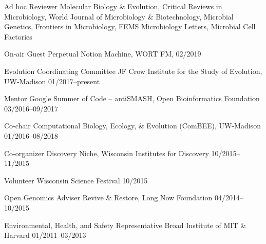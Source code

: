 

\begin{cvhonors}

\cvhonor
{Ad hoc Reviewer}
{Molecular Biology \& Evolution, Critical Reviews in Microbiology, World Journal of Microbiology \& Biotechnology, Microbial Genetics, Frontiers in Microbiology, FEMS Microbiology Letters, Microbial Cell Factories}
{}

\cvhonor
{On-air Guest}
{Perpetual Notion Machine, WORT FM, \textbf{\textit{}}}
{02/2019}

\cvhonor
{Evolution Coordinating Committee}
{JF Crow Institute for the Study of Evolution, UW-Madison}
{01/2017--present}

\cvhonor
{Mentor}
{Google Summer of Code -- antiSMASH, Open Bioinformatics Foundation}
{03/2016--09/2017}

\cvhonor
{Co-chair}
{Computational Biology, Ecology, \& Evolution (ComBEE), UW-Madison}
{01/2016--08/2018}

\cvhonor
{Co-organizer}
{Discovery Niche, Wisconsin Institutes for Discovery}
{10/2015--11/2015}

\cvhonor
{Volunteer}
{Wisconsin Science Festival}
{10/2015}

\cvhonor
{Open Genomics Adviser}
{Revive \& Restore, Long Now Foundation}
{04/2014--10/2015}

\cvhonor
{Environmental, Health, and Safety Representative}
{Broad Institute of MIT \& Harvard}
{01/2011--03/2013}

\end{cvhonors}